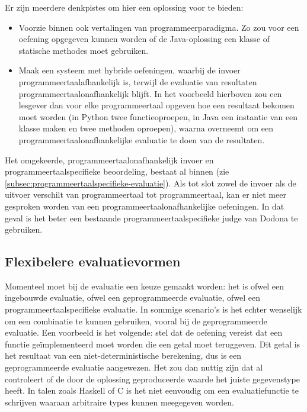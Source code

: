 Er zijn meerdere denkpistes om hier een oplossing voor te bieden:

\begin{itemize}
    \item Voorzie binnen \tested{} ook vertalingen van programmeerparadigma.
    Zo zou voor een oefening opgegeven kunnen worden of de Java-oplossing een klasse of statische methodes moet gebruiken.
    \item Maak een systeem met hybride oefeningen, waarbij de invoer programmeertaalafhankelijk is, terwijl de evaluatie van resultaten programmeertaalonafhankelijk blijft.
    In het voorbeeld hierboven zou een lesgever dan voor elke programmeertaal opgeven hoe een resultaat bekomen moet worden (in Python twee functieoproepen, in Java een instantie van een klasse maken en twee methoden oproepen), waarna \tested{} overneemt om een programmeertaalonafhankelijke evaluatie te doen van de resultaten.
\end{itemize}

Het omgekeerde, programmeertaalonafhankelijk invoer en programmeertaalspecifieke beoordeling, bestaat al binnen \tested{} (zie \cref{subsec:programmeertaalspecifieke-evaluatie}).
Als tot slot zowel de invoer als de uitvoer verschilt van programmeertaal tot programmeertaal, kan er niet meer gesproken worden van een programmeertaalonafhankelijke oefeningen.
In dat geval is het beter een bestaande programmeertaalspecifieke judge van Dodona te gebruiken.

\subsection{Flexibelere evaluatievormen}\label{subsec:combinaties-van-evaluatiemanieren}

Momenteel moet bij de evaluatie een keuze gemaakt worden: het is ofwel een ingebouwde evaluatie, ofwel een geprogrammeerde evaluatie, ofwel een programmeertaalspecifieke evaluatie.
In sommige scenario's is het echter wenselijk om een combinatie te kunnen gebruiken, vooral bij de geprogrammeerde evaluatie.
Een voorbeeld is het volgende: stel dat de oefening vereist dat een functie geïmplementeerd moet worden die een getal moet teruggeven.
Dit getal is het resultaat van een niet-deterministische berekening, dus is een geprogrammeerde evaluatie aangewezen.
Het zou dan nuttig zijn dat \tested{} al controleert of de door de oplossing geproduceerde waarde het juiste gegevenstype heeft.
In talen zoals Haskell of C is het niet eenvoudig om een evaluatiefunctie te schrijven waaraan arbitraire types kunnen meegegeven worden.

